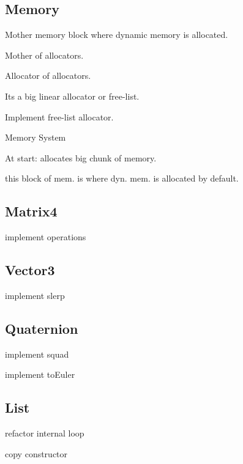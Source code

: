 



\subsection*{Memory}


\begin{DoxyItemize}
\item Mother memory block where dynamic memory is allocated.
\begin{DoxyItemize}
\item Mother of allocators.
\item Allocator of allocators.
\item It\textquotesingle{}s a big linear allocator or free-\/list.
\end{DoxyItemize}
\item Implement free-\/list allocator.
\item Memory System
\begin{DoxyItemize}
\item At start\+: allocates big chunk of memory.
\begin{DoxyItemize}
\item this block of mem. is where dyn. mem. is allocated by default. 


\end{DoxyItemize}
\end{DoxyItemize}
\end{DoxyItemize}

\subsection*{Matrix4}


\begin{DoxyItemize}
\item implement operations 


\end{DoxyItemize}

\subsection*{Vector3}


\begin{DoxyItemize}
\item implement slerp 


\end{DoxyItemize}

\subsection*{Quaternion}


\begin{DoxyItemize}
\item implement squad
\item implement to\+Euler 


\end{DoxyItemize}

\subsection*{List}


\begin{DoxyItemize}
\item refactor internal loop
\item copy constructor 

 
\end{DoxyItemize}